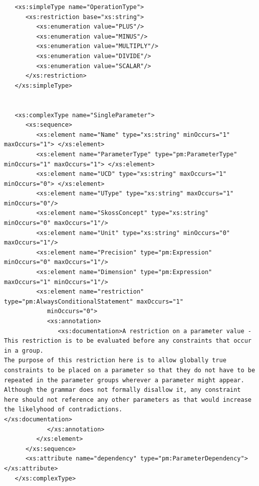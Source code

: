 \documentclass[a4paper,11pt] {ivoa}
\begin{document}
\begin{lstlisting}
   <xs:simpleType name="OperationType">
      <xs:restriction base="xs:string">
         <xs:enumeration value="PLUS"/>
         <xs:enumeration value="MINUS"/>
         <xs:enumeration value="MULTIPLY"/>
         <xs:enumeration value="DIVIDE"/>
         <xs:enumeration value="SCALAR"/>
      </xs:restriction>
   </xs:simpleType>


   <xs:complexType name="SingleParameter">
      <xs:sequence>
         <xs:element name="Name" type="xs:string" minOccurs="1" maxOccurs="1"> </xs:element>
         <xs:element name="ParameterType" type="pm:ParameterType" minOccurs="1" maxOccurs="1"> </xs:element>
         <xs:element name="UCD" type="xs:string" maxOccurs="1" minOccurs="0"> </xs:element>
         <xs:element name="UType" type="xs:string" maxOccurs="1" minOccurs="0"/>
         <xs:element name="SkossConcept" type="xs:string" minOccurs="0" maxOccurs="1"/>
         <xs:element name="Unit" type="xs:string" minOccurs="0" maxOccurs="1"/>
         <xs:element name="Precision" type="pm:Expression" minOccurs="0" maxOccurs="1"/>
         <xs:element name="Dimension" type="pm:Expression" maxOccurs="1" minOccurs="1"/>
         <xs:element name="restriction" type="pm:AlwaysConditionalStatement" maxOccurs="1"
            minOccurs="0">
            <xs:annotation>
               <xs:documentation>A restriction on a parameter value - This restriction is to be evaluated before any constraints that occur in a group. 
The purpose of this restriction here is to allow globally true constraints to be placed on a parameter so that they do not have to be repeated in the parameter groups wherever a parameter might appear.
Although the grammar does not formally disallow it, any constraint here should not reference any other parameters as that would increase the likelyhood of contradictions.
</xs:documentation>
            </xs:annotation>
         </xs:element>
      </xs:sequence>
      <xs:attribute name="dependency" type="pm:ParameterDependency"> </xs:attribute>
   </xs:complexType>


\end{lstlisting}
\end{document}
